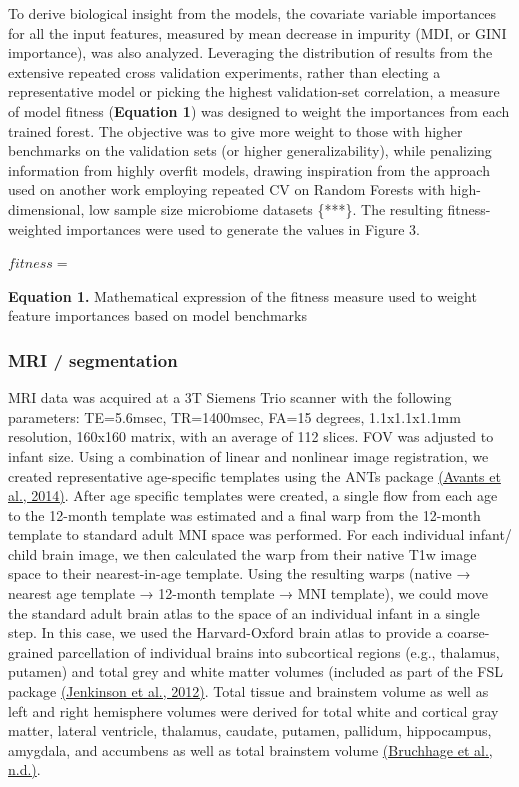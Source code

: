\documentclass[a4paper]{article}
\begin{document}
To derive biological insight from the models, the covariate variable
importances for all the input features, measured by mean decrease in
impurity (MDI, or GINI importance), was also analyzed. Leveraging the
distribution of results from the extensive repeated cross validation
experiments, rather than electing a representative model or picking the
highest validation-set correlation, a measure of model fitness
(\textbf{Equation 1}) was designed to weight the importances from each
trained forest. The objective was to give more weight to those with
higher benchmarks on the validation sets (or higher generalizability),
while penalizing information from highly overfit models, drawing
inspiration from the approach used on another work employing repeated CV
on Random Forests with high-dimensional, low sample size microbiome
datasets \{***\}. The resulting fitness-weighted importances were used
to generate the values in Figure 3.

\(fitness =\)

\textbf{Equation 1.} Mathematical expression of the fitness measure used
to weight feature importances based on model benchmarks

\subsubsection{MRI / segmentation}

MRI data was acquired at a 3T Siemens Trio scanner with the following
parameters: TE=5.6msec, TR=1400msec, FA=15 degrees, 1.1x1.1x1.1mm
resolution, 160x160 matrix, with an average of 112 slices. FOV was
adjusted to infant size. Using a combination of linear and nonlinear
image registration, we created representative age-specific templates
using the ANTs package
\href{https://www.zotero.org/google-docs/?ZlWDfL}{(Avants et al.,
2014)}. After age specific templates were created, a single flow from
each age to the 12-month template was estimated and a final warp from
the 12-month template to standard adult MNI space was performed. For
each individual infant/ child brain image, we then calculated the warp
from their native T1w image space to their nearest-in-age template.
Using the resulting warps (native → nearest age template → 12-month
template → MNI template), we could move the standard adult brain atlas
to the space of an individual infant in a single step. In this case, we
used the Harvard-Oxford brain atlas to provide a coarse-grained
parcellation of individual brains into subcortical regions (e.g.,
thalamus, putamen) and total grey and white matter volumes (included as
part of the FSL package
\href{https://www.zotero.org/google-docs/?AapPN7}{(Jenkinson et al.,
2012)}. Total tissue and brainstem volume as well as left and right
hemisphere volumes were derived for total white and cortical gray
matter, lateral ventricle, thalamus, caudate, putamen, pallidum,
hippocampus, amygdala, and accumbens as well as total brainstem volume
\href{https://www.zotero.org/google-docs/?MCDDB9}{(Bruchhage et al.,
n.d.)}.
\end{document}
